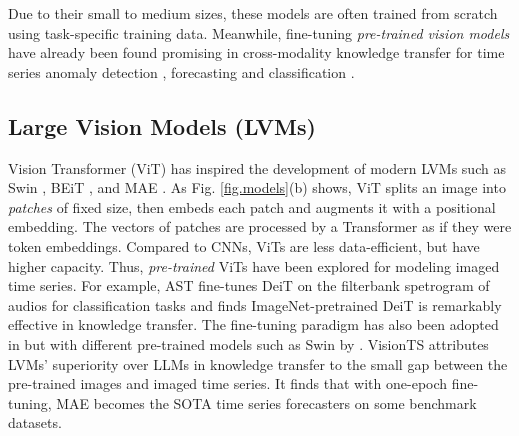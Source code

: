 Due to their small to medium sizes, these models are often trained from scratch using task-specific training data. %
Meanwhile, fine-tuning {\em pre-trained vision models}  %
have already been found promising in cross-modality knowledge transfer for time series anomaly detection \cite{namura2024training}, forecasting \cite{li2020forecasting} and classification \cite{jin2023classification}.


\subsection{Large Vision Models (LVMs)}\label{sec.lvms}

Vision Transformer (ViT) \cite{dosovitskiy2021image} has %
inspired the development of %
modern LVMs %
such as %
Swin \cite{liu2021swin}, BEiT \cite{bao2022beit}, and MAE \cite{he2022masked}. %
As Fig. \ref{fig.models}(b) shows, ViT splits an %
image into {\em patches} of fixed size, then embeds each patch and augments it with a positional embedding. The %
vectors of patches are processed by a Transformer %
as if they were token embeddings. Compared to CNNs, ViTs are less data-efficient, but have higher capacity. %
Thus, %
{\em pre-trained} ViTs have been explored for modeling %
imaged time series. For example, AST \cite{gong2021ast} fine-tunes DeiT \cite{touvron2021training} on the filterbank spetrogram of audios %
for classification tasks and finds %
ImageNet-pretrained DeiT is remarkably effective in knowledge transfer. The fine-tuning paradigm has also been %
adopted in \cite{zeng2023pixels,li2023time} but with different pre-trained models %
such as Swin by \cite{li2023time}. 
VisionTS \cite{chen2024visionts} %
attributes %
LVMs' superiority over LLMs in knowledge transfer %
to the small gap between the pre-trained images and imaged time series. %
It %
finds that with one-epoch fine-tuning, MAE becomes the SOTA time series forecasters on %
some benchmark datasets.

